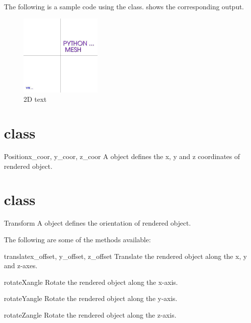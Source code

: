 The following is a sample code using the \Text class.
 shows the corresponding output.


\begin{figure}[ht]
\begin{center}
\includegraphics[width=40mm]{figures/Text}
\end{center}
\caption{2D text}
\label{fig:text.1}
\end{figure}

\section{\Position class}
\begin{classdesc}{Position}{x_coor, y_coor, z_coor}
A \Position object defines the x, y and z coordinates of rendered object.
\end{classdesc}

\section{\Transform class}
\begin{classdesc}{Transform}{}
A \Transform object defines the orientation of rendered object.
\end{classdesc}

The following are some of the methods available:
\begin{methoddesc}[Transform]{translate}{x_offset, y_offset, z_offset}
Translate the rendered object along the x, y and z-axes.
\end{methoddesc}

\begin{methoddesc}[Transform]{rotateX}{angle}
Rotate the rendered object along the x-axis.
\end{methoddesc}

\begin{methoddesc}[Transform]{rotateY}{angle}
Rotate the rendered object along the y-axis.
\end{methoddesc}

\begin{methoddesc}[Transform]{rotateZ}{angle}
Rotate the rendered object along the z-axis.
\end{methoddesc}

